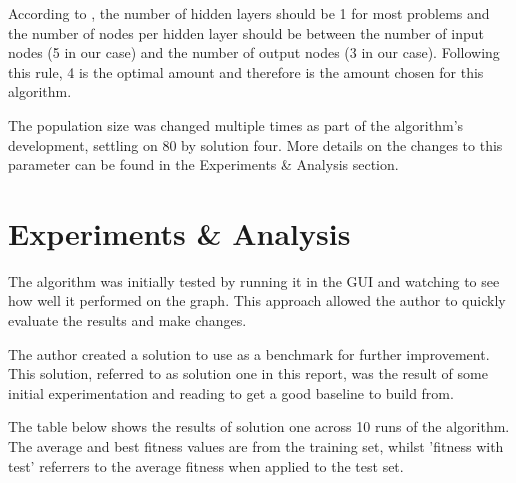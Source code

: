 \documentclass[sigconf]{acmart}
\begin{document}
According to \cite{hiddenLayers}, the number of hidden layers should be 1 for most problems and the number of nodes per hidden layer should be between the number of input nodes (5 in our case) and the number of output nodes (3 in our case). Following this rule, 4 is the optimal amount and therefore is the amount chosen for this algorithm.

The population size was changed multiple times as part of the algorithm's development, settling on 80 by solution four. More details on the changes to this parameter can be found in the Experiments \& Analysis section.

\section{Experiments \& Analysis}
The algorithm was initially tested by running it in the GUI and watching to see how well it performed on the graph. This approach allowed the author to quickly evaluate the results and make changes. 

The author created a solution to use as a benchmark for further improvement. This solution, referred to as solution one in this report, was the result of some initial experimentation and reading to get a good baseline to build from.

The table below shows the results of solution one across 10 runs of the algorithm. The average and best fitness values are from the training set, whilst 'fitness with test' referrers to the average fitness when applied to the test set.
\end{document}
